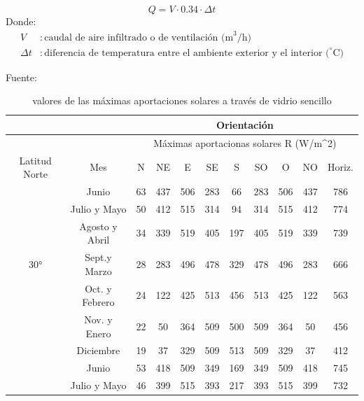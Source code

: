 \begin{itemize}
\begin{equation} \label{eq:carga_ventilacion_infiltracion}
	Q = V \cdot 0{.}34 \cdot \Delta t
\end{equation}
Donde:
\begin{align*}
	V & : \text{caudal de aire infiltrado o de ventilación (m}^3/\text{h)} \\
	\Delta t & : \text{diferencia de temperatura entre el ambiente exterior y el interior (}^\circ\text{C)}
\end{align*}

\begin{table}[H]
	\centering
	\caption{valores de las máximas aportaciones solares a través de vidrio sencillo } Fuente: \cite{carrier-1980}
	\begin{tabular}{@{}lcccccccccc@{}}
		\toprule
		& \multicolumn{1}{l}{} & \multicolumn{9}{c}{Orientación}                                             \\ \midrule
		& \multicolumn{1}{l}{} & \multicolumn{9}{c}{Máximas aportacionas solares R (W/m\textasciicircum{}2)} \\ \cmidrule(l){3-11} 
		\multicolumn{1}{c}{Latitud Norte} & Mes                  & N     & NE     & E      & SE     & S     & SO    & O     & NO    & Horiz.   \\ \midrule
		\multirow{3}{*}{}                 & Junio                & 63    & 437    & 506    & 283    & 66    & 283   & 506   & 437   & 786      \\
		& Julio y Mayo         & 50    & 412    & 515    & 314    & 94    & 314   & 515   & 412   & 774      \\
		& Agosto y Abril       & 34    & 339    & 519    & 405    & 197   & 405   & 519   & 339   & 739      \\
		\multicolumn{1}{c}{30°}           & Sept.y Marzo         & 28    & 283    & 496    & 478    & 329   & 478   & 496   & 283   & 666      \\
		& Oct. y Febrero       & 24    & 122    & 425    & 513    & 456   & 513   & 425   & 122   & 563      \\
		& Nov. y Enero         & 22    & 50     & 364    & 509    & 500   & 509   & 364   & 50    & 456      \\
		& Diciembre            & 19    & 37     & 329    & 509    & 513   & 509   & 329   & 37    & 412      \\ \midrule
		& Junio                & 53    & 418    & 509    & 349    & 169   & 349   & 509   & 418   & 745      \\
		& Julio y Mayo         & 46    & 399    & 515    & 393    & 217   & 393   & 515   & 399   & 732      \\

\end{tabular}
\end{table}
\end{itemize}
